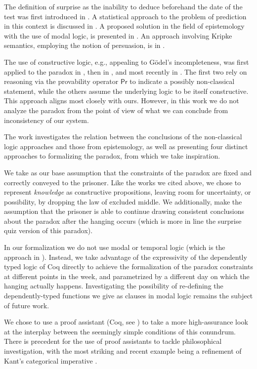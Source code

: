 \documentclass[runningheads]{llncs}
\begin{document}
The definition of surprise as the inability to deduce beforehand the date of the test
was first introduced in \cite{prediction}. A statistical approach to the problem
of prediction in this context is discussed in \cite{statistical}.
A proposed solution in the field of epistemology with the use of modal
logic, is presented in \cite{modalepistemic}. An approach involving
Kripke semantics, employing the notion of persuasion, is in \cite{kripkemodal}.

The use of constructive logic,
e.g., appealing to G\"{o}del's incompleteness, was first applied to the
paradox in \cite{goedelized}, then in \cite{godelinconsistent}, and most recently
in \cite{constructive} \cite{nonpredet}. The first two rely on reasoning via the
provability operator $\mathsf{Pr}$ to indicate
a possibly non-classical statement, while the others assume the underlying logic to be itself
constructive. This approach aligns most closely with ours.
However, in this work we do not analyze the paradox from the point of view of
what we can conclude from inconsistency of our system.

The work \cite{fourpossible} investigates the relation between the conclusions
of the non-classical logic approaches and those from epistemology, as well
as presenting four distinct approaches to formalizing the paradox, from which
we take inspiration.

We take as our base assumption that the constraints of the paradox are
fixed and correctly conveyed to the prisoner.
Like the works we cited above, we chose to represent
\emph{knowledge} as constructive propositions, leaving room for uncertainty, or possibility, by
dropping the law of excluded middle. We additionally, make the assumption that
the prisoner is able to continue drawing consistent conclusions about the paradox
after the hanging occurs (which is more in line the surprise quiz version of this paradox).

In our formalization we do not use modal or temporal logic
(which is the approach in \cite{modalepistemic}).
Instead, we take advantage of the expressivity of the dependently typed logic of Coq directly to
achieve the formalization of the paradox constraints at different points in the week,
and parametrized by a different day on which the hanging actually happens.
Investigating the possibility of re-defining the
dependently-typed functions we give as clauses in modal logic remains the subject of future work.

We chose to use a proof
assistant (Coq, see \cite{coqmanual}) to take a more high-assurance look at the
interplay between the seemingly simple conditions of this conundrum.
There is precedent for the use of proof assistants to tackle philosophical
investigation, with the most striking and recent example
being a refinement of Kant's categorical imperative \cite{categoricalkant}.
\end{document}
